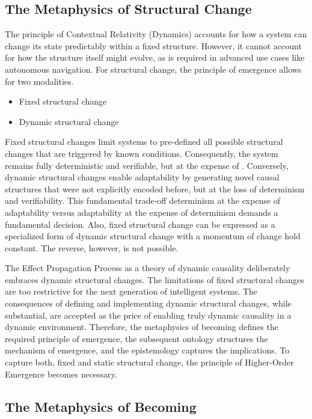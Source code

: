 \subsection{The Metaphysics of Structural Change} 
\label{sec:metaphysics_becoming}

The principle of Contextual Relativity (Dynamics) accounts for how a system can change its state predictably within a fixed structure. 
However, it cannot account for how the structure itself might evolve, as is required in advanced use cases like autonomous navigation. 
For structural change, the principle of emergence allows for two modalities.

\begin{itemize}
	\item Fixed structural change
	\item Dynamic structural change
\end{itemize}

Fixed structural changes limit systems to pre-defined all possible structural changes that are triggered by known conditions.
Consequently, the system remains fully deterministic and verifiable, but at the expense of . 
Conversely, dynamic structural changes enable adaptability by  generating novel causal structures that were not explicitly encoded before,
but at the loss of determinism and verifiability. This fundamental trade-off determinism at the expense of adaptability versus
adaptability at the expense of  determinism demands a fundamental decision. Also, fixed structural change can be expressed 
as a specialized form of dynamic structural change with a momentum of change hold constant. The reverse, however, is not possible. 

The Effect Propagation Process as a theory of dynamic causality deliberately embraces dynamic structural changes.
The limitations of fixed structural changes are too restrictive for the next generation of intelligent systems.
The consequences of defining and implementing dynamic structural changes, while substantial, 
are accepted as the price of enabling truly dynamic causality in a dynamic environment. 
Therefore, the metaphysics of becoming defines the required principle of emergence, 
the subsequent ontology structures the mechanism of emergence, and the epistemology captures 
the implications. To capture both, fixed and static structural change, the principle of Higher-Order Emergence  becomes necessary. 


\subsection{The Metaphysics of Becoming} 
\label{sec:metaphysics_becoming}

